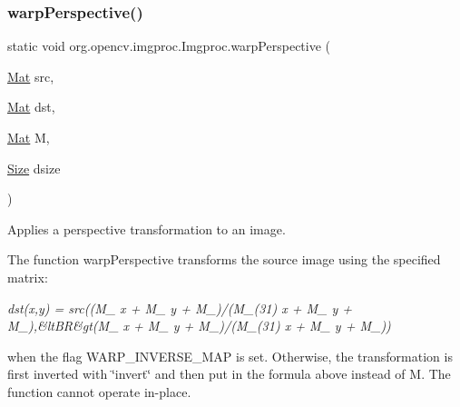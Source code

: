 \subsubsection{\texorpdfstring{warp\+Perspective()}{warpPerspective()}\hspace{0.1cm}{\footnotesize\ttfamily [3/3]}}
{\footnotesize\ttfamily static void org.\+opencv.\+imgproc.\+Imgproc.\+warp\+Perspective (\begin{DoxyParamCaption}\item[{\mbox{\hyperlink{classorg_1_1opencv_1_1core_1_1_mat}{Mat}}}]{src,  }\item[{\mbox{\hyperlink{classorg_1_1opencv_1_1core_1_1_mat}{Mat}}}]{dst,  }\item[{\mbox{\hyperlink{classorg_1_1opencv_1_1core_1_1_mat}{Mat}}}]{M,  }\item[{\mbox{\hyperlink{classorg_1_1opencv_1_1core_1_1_size}{Size}}}]{dsize }\end{DoxyParamCaption})\hspace{0.3cm}{\ttfamily [static]}}

Applies a perspective transformation to an image.

The function {\ttfamily warp\+Perspective} transforms the source image using the specified matrix\+:

{\itshape dst(x,y) = src((M\+\_ x + M\+\_ y + M\+\_)/(M\+\_\+(31) x + M\+\_ y + M\+\_),\&lt\+BR\&gt(M\+\_ x + M\+\_ y + M\+\_)/(M\+\_\+(31) x + M\+\_ y + M\+\_))}

when the flag {\ttfamily W\+A\+R\+P\+\_\+\+I\+N\+V\+E\+R\+S\+E\+\_\+\+M\+AP} is set. Otherwise, the transformation is first inverted with \char`\"{}invert\char`\"{} and then put in the formula above instead of {\ttfamily M}. The function cannot operate in-\/place.


